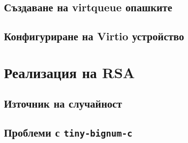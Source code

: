   \subsection{Създаване на virtqueue опашките}

  \subsection{Конфигуриране на Virtio устройство}

\section{Реализация на RSA}
  \subsection{Източник на случайност}

  \subsection{Проблеми с {\tt tiny-bignum-c}}

